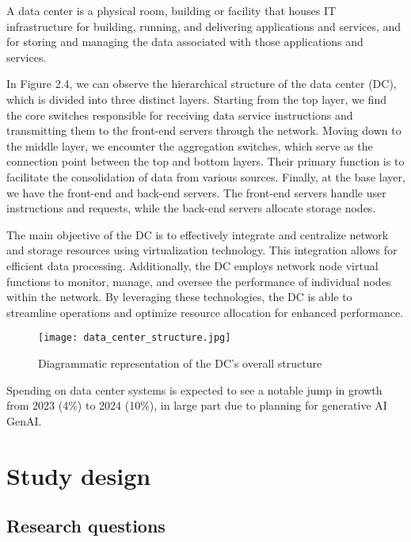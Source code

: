 \documentclass[
  a4paper,  %
  twoside,  %
  bibliography=totoc,
  headsepline,
  cleardoublepage=empty,
  parskip=half,
  draft=false
]{scrbook}
\begin{document}
A data center is a physical room, building or facility that houses IT infrastructure for building, running, and delivering applications and services, and for storing and managing the data associated with those applications and services\cite{ibmWhatData}.


In Figure 2.4, we can observe the hierarchical structure of the data center (DC), which is divided into three distinct layers. Starting from the top layer, we find the core switches responsible for receiving data service instructions and transmitting them to the front-end servers through the network. Moving down to the middle layer, we encounter the aggregation switches, which serve as the connection point between the top and bottom layers. Their primary function is to facilitate the consolidation of data from various sources. Finally, at the base layer, we have the front-end and back-end servers. The front-end servers handle user instructions and requests, while the back-end servers allocate storage nodes\cite{ZHU2023104322}.

The main objective of the DC is to effectively integrate and centralize network and storage resources using virtualization technology. This integration allows for efficient data processing. Additionally, the DC employs network node virtual functions to monitor, manage, and oversee the performance of individual nodes within the network. By leveraging these technologies, the DC is able to streamline operations and optimize resource allocation for enhanced performance\cite{ZHU2023104322}.


\begin{figure}
	\centering
	\texttt{[image: data\_center\_structure.jpg]}
	\caption{Diagrammatic representation of the DC's overall structure\cite{ZHU2023104322}}
\end{figure}

Spending on data center systems is expected to see a notable jump in growth from 2023 (4\%) to 2024 (10\%), in large part due to planning for generative AI GenAI\cite{Gartner2024}.


\chapter{Study design}
\section{Research questions}
\end{document}
